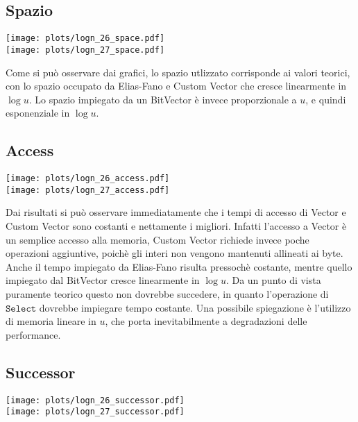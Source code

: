 \documentclass{article}
\newcommand{\ttt}{\texttt}
\begin{document}
\subsection{Spazio}

\texttt{[image: plots/logn\_26\_space.pdf]}
\\
\texttt{[image: plots/logn\_27\_space.pdf]}

Come si pu\`o osservare dai grafici, lo spazio utlizzato corrisponde ai valori teorici,
con lo spazio occupato da Elias-Fano e Custom Vector che cresce linearmente in $\log u$.
Lo spazio impiegato da un BitVector \`e invece proporzionale a $u$, e quindi esponenziale in $\log u$.

\pagebreak
\subsection{Access}
\texttt{[image: plots/logn\_26\_access.pdf]}
\\
\texttt{[image: plots/logn\_27\_access.pdf]}

Dai risultati si pu\`o osservare immediatamente che i tempi di accesso di Vector e Custom Vector sono costanti e nettamente i migliori. Infatti l'accesso a Vector \`e un semplice accesso alla memoria, Custom Vector richiede invece poche operazioni aggiuntive, poich\`e gli interi non vengono mantenuti allineati ai byte.\\
Anche il tempo impiegato da Elias-Fano risulta pressoch\`e costante, mentre quello impiegato dal BitVector cresce linearmente in $\log u$. Da un punto di vista puramente teorico questo non dovrebbe succedere, in quanto l'operazione di $\ttt{Select}$ dovrebbe impiegare tempo costante. Una possibile spiegazione \`e l'utilizzo di memoria lineare in $u$, che porta inevitabilmente a degradazioni delle performance.

\pagebreak
\subsection{Successor}
\texttt{[image: plots/logn\_26\_successor.pdf]}
\\
\texttt{[image: plots/logn\_27\_successor.pdf]}
\end{document}
